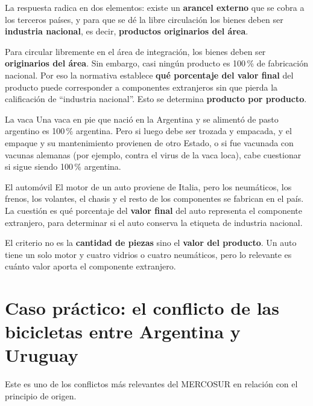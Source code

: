 \documentclass[12pt,oneside]{book}
\begin{document}
La respuesta radica en dos elementos: existe un \textbf{arancel externo} que se cobra a los terceros países, y para que se dé la libre circulación los bienes deben ser \textbf{industria nacional}, es decir, \textbf{productos originarios del área}.

\begin{important}
Para circular libremente en el área de integración, los bienes deben ser \textbf{originarios del área}. Sin embargo, casi ningún producto es 100\,\% de fabricación nacional. Por eso la normativa establece \textbf{qué porcentaje del valor final} del producto puede corresponder a componentes extranjeros sin que pierda la calificación de ``industria nacional''. Esto se determina \textbf{producto por producto}.
\end{important}

\begin{example}{La vaca}
Una vaca en pie que nació en la Argentina y se alimentó de pasto argentino es 100\,\% argentina. Pero si luego debe ser trozada y empacada, y el empaque y su mantenimiento provienen de otro Estado, o si fue vacunada con vacunas alemanas (por ejemplo, contra el virus de la vaca loca), cabe cuestionar si sigue siendo 100\,\% argentina.
\end{example}

\begin{example}{El automóvil}
El motor de un auto proviene de Italia, pero los neumáticos, los frenos, los volantes, el chasis y el resto de los componentes se fabrican en el país. La cuestión es qué porcentaje del \textbf{valor final} del auto representa el componente extranjero, para determinar si el auto conserva la etiqueta de industria nacional.
\end{example}

\begin{important}
El criterio no es la \textbf{cantidad de piezas} sino el \textbf{valor del producto}. Un auto tiene un solo motor y cuatro vidrios o cuatro neumáticos, pero lo relevante es cuánto valor aporta el componente extranjero.
\end{important}

\section{Caso práctico: el conflicto de las bicicletas entre Argentina y Uruguay}

Este es uno de los conflictos más relevantes del MERCOSUR en relación con el principio de origen.
\end{document}
